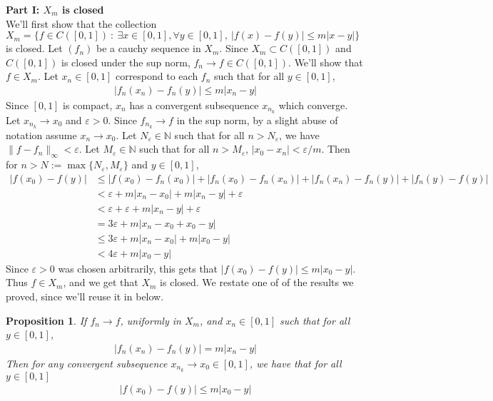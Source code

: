 \documentclass[12pt]{exam}
\theoremstyle{plain} %
\newtheorem{proposition}{Proposition}[section]
\theoremstyle{definition} %
\theoremstyle{remark} %
\begin{document}
\begin{questions}
  \question
  \begin{solution}
    \textbf{Part I: $X_m$ is closed}\\
    We'll first show that the collection $X_m = \{ f \in C([0, 1])
      \ : \ \exists x \in [0, 1], \forall y \in [0, 1], \ |f(x) - f(y)|
    \le m |x - y|  \}$ is closed. Let $(f_n)$ be a cauchy sequence in
    $X_m$. Since $X_m \subset C([0, 1])$ and $C([0 ,1 ])$ is closed
    under the sup norm, $f_n \to f \in C([0, 1])$. We'll show that
    $f \in X_m$.
    Let $x_n \in [0, 1]$ correspond to each $f_n$ such that for
    all $y \in [0, 1]$,
    \begin{align*}
      |f_n(x_n) - f_n(y)| \le m |x_n - y|
    \end{align*}
    Since $[0, 1]$ is compact, $x_n$ has a convergent subsequence
    $x_{n_k}$ which converge. Let $x_{n_k} \to x_0$ and $\varepsilon
    > 0$. Since $f_{n_k} \to f$ in the sup norm, by a slight abuse of
    notation assume $x_n \to x_0$.
    Let $N_\varepsilon \in \mathbb{N}$ such that for all $n >
    N_\varepsilon$, we have $\|f - f_n\|_\infty < \varepsilon$. Let
    $M_\varepsilon \in \mathbb{N}$ such that for all $n >
    M_\varepsilon$, $|x_0 - x_n| < \varepsilon/m$. Then for $n > N :=
    \max\{N_\varepsilon, M_\varepsilon\}$ and $y \in [0, 1]$,
    \begin{align*}
      |f(x_0) - f(y)| &\le |f(x_0) - f_n(x_0)| + |f_n(x_0) - f_n(x_n)|
      + |f_n(x_n) - f_n(y)| + |f_n(y) - f(y)| \\
      &< \varepsilon + m |x_n - x_0| + m|x_n - y| + \varepsilon \\
      &< \varepsilon + \varepsilon + m |x_n - y| + \varepsilon \\
      &= 3 \varepsilon + m|x_n - x_0 + x_0 - y| \\
      &\le 3 \varepsilon + m |x_n - x_0| + m |x_0 - y| \\
      &< 4 \varepsilon + m |x_0 - y|
    \end{align*}
    Since $\varepsilon > 0$ was chosen arbitrarily, this gets that
    $|f(x_0) - f(y)| \le m | x_0 - y|$. Thus $f \in X_m$, and we get
    that $X_m$ is closed. We restate one of of the results we proved,
    since we'll reuse it in below.

    \begin{proposition}
      \label{prop:4}
      If $f_n \to f$, uniformly in $X_m$, and $x_n \in
      [0, 1]$ such that  for all $y \in [0, 1]$,
      \begin{align*}
        |f_n(x_n) - f_n(y)| = m |x_n - y|
      \end{align*}
      Then for any convergent subsequence $x_{n_k} \to x_0 \in [0,
      1]$, we have
      that for all $y \in [0, 1]$
      \begin{align*}
        |f(x_0) - f(y)| \le m |x_0 - y|
      \end{align*}
    \end{proposition}


\end{solution}
\end{questions}
\end{document}
